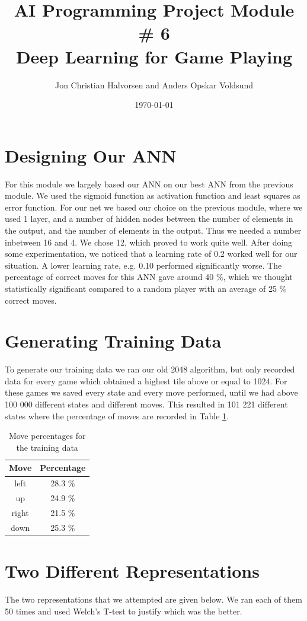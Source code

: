 \documentclass[11pt,a4paper]{article}
\author{Jon Christian Halvorsen and Anders Opskar Voldsund}
\title{ \textbf{ AI Programming Project Module \# 6 }  \\
Deep Learning for Game Playing }
\date{\today}
\begin{document}
\maketitle

\section*{Designing Our ANN}
For this module we largely based our ANN on our best ANN from the previous module. We used the sigmoid function as activation function and least squares as error function. For our net we based our choice on the previous module, where we used 1 layer, and a number of hidden nodes between the number of elements in the output, and the number of elements in the output. Thus we needed a number inbetween 16 and 4. We chose 12, which proved to work quite well. After doing some experimentation, we noticed that a learning rate of 0.2 worked well for our situation. A lower learning rate, e.g. 0.10 performed significantly worse. The percentage of correct moves for this ANN gave around 40 $\%$, which we thought statistically significant compared to a random player with an average of 25 $\%$ correct moves.

\section*{Generating Training Data}
To generate our training data we ran our old 2048 algorithm, but only recorded data for every game which obtained a highest tile above or equal to 1024. For these games we saved every state and every move performed, until we had above 100 000 different states and different moves. This resulted in 101 221 different states where the percentage of moves are recorded in Table \ref{tab:percentage}.

\begin{table}[h!]
\centering
\caption{Move percentages for the training data}
\begin{tabular}{cc}
Move & Percentage \\
\hline
left & 28.3 $\%$ \\
up & 24.9 $\%$ \\
right & 21.5 $\%$ \\
down & 25.3 $\%$
\end{tabular}
\label{tab:percentage}
\end{table}

\section*{Two Different Representations}
The two representations that we attempted are given below. We ran each of them 50 times and used Welch's T-test to justify which was the better.
\end{document}
